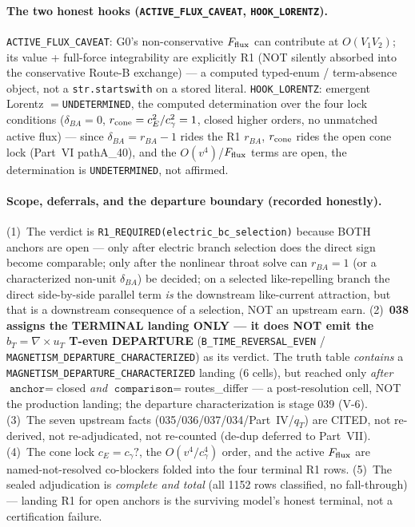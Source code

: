 \paragraph{The two honest hooks (\texttt{ACTIVE\_FLUX\_CAVEAT}, \texttt{HOOK\_LORENTZ}).}
\texttt{ACTIVE\_FLUX\_CAVEAT}: G0's non-conservative \(F_{\rm flux}\) can
contribute at \(O(V_1V_2)\); its value + full-force integrability are explicitly
R1 (NOT silently absorbed into the conservative Route-B exchange) --- a computed
typed-enum / term-absence object, not a \texttt{str.startswith} on a stored
literal. \texttt{HOOK\_LORENTZ}: emergent Lorentz \(=\)\texttt{UNDETERMINED}, the
computed determination over the four lock conditions (\(\delta_{BA}=0\),
\(r_{\rm cone}=c_E^2/c_\gamma^2=1\), closed higher orders, no unmatched active
flux) --- since \(\delta_{BA}=r_{BA}-1\) rides the R1 \(r_{BA}\), \(r_{\rm cone}\)
rides the open cone lock (Part~VI pathA\_40), and the \(O(v^4)\)/\(F_{\rm flux}\)
terms are open, the determination is \texttt{UNDETERMINED}, not affirmed.

\paragraph{Scope, deferrals, and the departure boundary (recorded honestly).}
(1)~The verdict is \texttt{R1\_REQUIRED(electric\_bc\_selection)} because BOTH
anchors are open --- only after electric branch selection does the direct sign
become comparable; only after the nonlinear throat solve can \(r_{BA}=1\) (or a
characterized non-unit \(\delta_{BA}\)) be decided; on a selected like-repelling
branch the direct side-by-side parallel term \emph{is} the downstream
like-current attraction, but that is a downstream consequence of a selection,
NOT an upstream earn. (2)~\textbf{038 assigns the TERMINAL landing ONLY --- it
does NOT emit the \(b_T=\nabla\times u_T\) T-even DEPARTURE}
(\texttt{B\_TIME\_REVERSAL\_EVEN} / \texttt{MAGNETISM\_DEPARTURE\_CHARACTERIZED})
as its verdict. The truth table \emph{contains} a
\texttt{MAGNETISM\_DEPARTURE\_CHARACTERIZED} landing (6 cells), but reached only
\emph{after} \(\texttt{anchor}=\)closed \emph{and}
\(\texttt{comparison}=\)routes\_differ --- a post-resolution cell, NOT the
production landing; the departure characterization is stage 039 (V-6). (3)~The
seven upstream facts (035/036/037/034/Part~IV/\(q_T\)) are CITED, not re-derived,
not re-adjudicated, not re-counted (de-dup deferred to Part~VII). (4)~The cone
lock \(c_E{=}c_\gamma?\), the \(O(v^4/c_\gamma^4)\) order, and the active
\(F_{\rm flux}\) are named-not-resolved co-blockers folded into the four terminal
R1 rows. (5)~The sealed adjudication is \emph{complete and total} (all 1152 rows
classified, no fall-through) --- landing R1 for open anchors is the surviving
model's honest terminal, not a certification failure.

